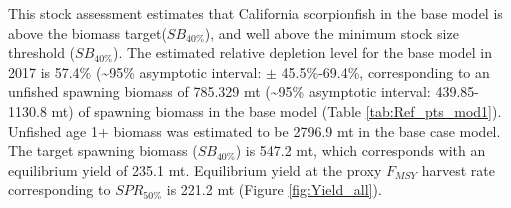 \documentclass[12pt,]{article}
\begin{document}
This stock assessment estimates that California scorpionfish in the base
model is above the biomass target(\(SB_{40\%}\)), and well above the
minimum stock size threshold (\(SB_{40\%}\)). The estimated relative
depletion level for the base model in 2017 is 57.4\%
(\textasciitilde{}95\% asymptotic interval: \(\pm\) 45.5\%-69.4\%,
corresponding to an unfished spawning biomass of 785.329 mt
(\textasciitilde{}95\% asymptotic interval: 439.85-1130.8 mt) of
spawning biomass in the base model (Table \ref{tab:Ref_pts_mod1}).
Unfished age 1+ biomass was estimated to be 2796.9 mt in the base case
model. The target spawning biomass (\(SB_{40\%}\)) is 547.2 mt, which
corresponds with an equilibrium yield of 235.1 mt. Equilibrium yield at
the proxy \(F_{MSY}\) harvest rate corresponding to \(SPR_{50\%}\) is
221.2 mt (Figure \ref{fig:Yield_all}).

\FloatBarrier
\end{document}
